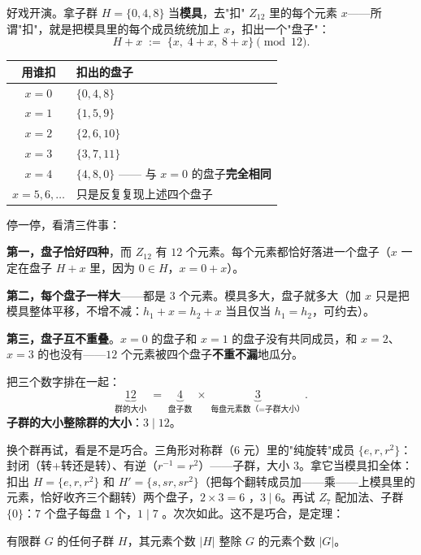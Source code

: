 好戏开演。拿子群 $H = \{0,4,8\}$ 当\textbf{模具}，去"扣" $Z_{12}$ 里的每个元素 $x$——所谓"扣"，就是把模具里的每个成员统统加上 $x$，扣出一个"盘子"：
\[
H + x \;:=\; \{x,\; 4+x,\; 8+x\} \pmod{12}.
\]

\begin{center}
\begin{tabular}{cl}
\toprule
用谁扣 & 扣出的盘子 \\
\midrule
$x = 0$ & $\{0, 4, 8\}$ \\
$x = 1$ & $\{1, 5, 9\}$ \\
$x = 2$ & $\{2, 6, 10\}$ \\
$x = 3$ & $\{3, 7, 11\}$ \\
$x = 4$ & $\{4, 8, 0\}$ —— 与 $x=0$ 的盘子\textbf{完全相同} \\
$x = 5, 6, \dots$ & 只是反复复现上述四个盘子 \\
\bottomrule
\end{tabular}
\end{center}

停一停，看清三件事：

\textbf{第一，盘子恰好四种}，而 $Z_{12}$ 有 $12$ 个元素。每个元素都恰好落进一个盘子（$x$ 一定在盘子 $H+x$ 里，因为 $0\in H$，$x = 0 + x$）。

\textbf{第二，每个盘子一样大}——都是 $3$ 个元素。模具多大，盘子就多大（加 $x$ 只是把模具整体平移，不增不减：$h_1 + x = h_2 + x$ 当且仅当 $h_1 = h_2$，可约去）。

\textbf{第三，盘子互不重叠}。$x=0$ 的盘子和 $x=1$ 的盘子没有共同成员，和 $x=2$、$x=3$ 的也没有——$12$ 个元素被四个盘子\textbf{不重不漏}地瓜分。

把三个数字排在一起：
\[
\underbrace{12}_{\text{群的大小}} \;=\; \underbrace{4}_{\text{盘子数}} \;\times\; \underbrace{3}_{\text{每盘元素数（}=\text{子群大小）}} .
\]
\textbf{子群的大小整除群的大小}：$3 \mid 12$。

换个群再试，看是不是巧合。三角形对称群（$6$ 元）里的"纯旋转"成员 $\{e, r, r^2\}$：封闭（转+转还是转）、有逆（$r^{-1} = r^2$）——子群，大小 $3$。拿它当模具扣全体：扣出 $H = \{e, r, r^2\}$ 和 $H' = \{s, sr, sr^2\}$（把每个翻转成员加——乘——上模具里的元素，恰好收齐三个翻转）两个盘子，$2\times3 = 6$ \checkmark，$3 \mid 6$。再试 $Z_7$ 配加法、子群 $\{0\}$：$7$ 个盘子每盘 $1$ 个，$1\mid7$ \checkmark。次次如此。这不是巧合，是定理：

\begin{dingli}[拉格朗日定理，1771]
有限群 $G$ 的任何子群 $H$，其元素个数 $|H|$ 整除 $G$ 的元素个数 $|G|$。
\end{dingli}

